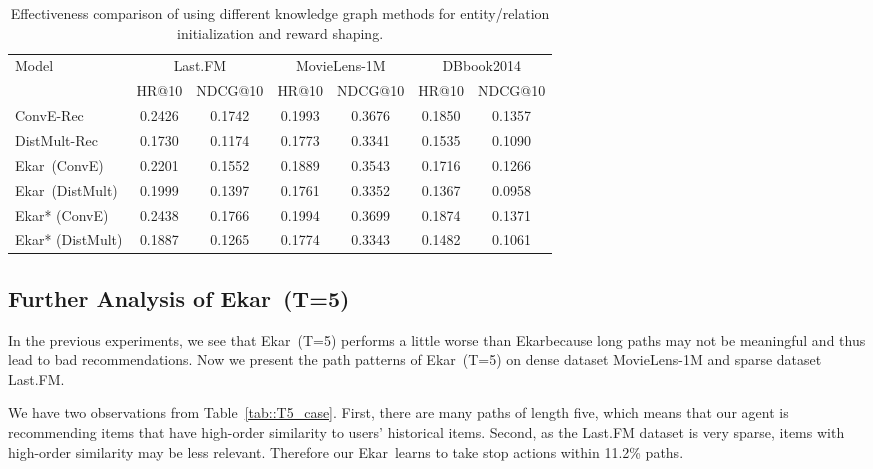 \documentclass{article}
\newcommand{\name}{Ekar}
\begin{document}
\begin{table}[ht]
\centering\caption{Effectiveness comparison of using different knowledge graph methods for entity/relation initialization and reward shaping.}\label{tab::distmult}
\begin{tabular}{lcccccc}
\toprule
\multirow{2}{*}{Model} & \multicolumn{2}{c}{Last.FM} & \multicolumn{2}{c}{MovieLens-1M} & \multicolumn{2}{c}{DBbook2014} \\
& HR@10 & NDCG@10 & HR@10 & NDCG@10 & HR@10 & NDCG@10 \\
\midrule 
ConvE-Rec & 0.2426 & 0.1742 & 0.1993 & 0.3676 & 0.1850 & 0.1357 \\\vspace{3pt}
DistMult-Rec & 0.1730 & 0.1174 & 0.1773 & 0.3341 & 0.1535 & 0.1090 \\
\name\ (ConvE) & 0.2201 & 0.1552 & 0.1889 & 0.3543 & 0.1716 & 0.1266\\\vspace{3pt}
\name\ (DistMult) & 0.1999 & 0.1397 & 0.1761 & 0.3352 & 0.1367 & 0.0958 \\
\name* (ConvE) & {0.2438} & {0.1766} & {0.1994} & {0.3699} & {0.1874} & {0.1371}\\
\name* (DistMult) & 0.1887 & 0.1265 & 0.1774 & 0.3343 & 0.1482 & 0.1061 \\
\bottomrule
\end{tabular}
\end{table}

\newpage
\subsection{Further Analysis of \name\ (T=5)}\label{app::t5}
In the previous experiments, we see that \name\ (T=5) performs a little worse than \name because long paths may not be meaningful and thus lead to bad recommendations. Now we present the path patterns of \name\ (T=5) on dense dataset MovieLens-1M and sparse dataset Last.FM.

We have two observations from Table~\ref{tab::T5_case}. First, there are many paths of length five, which means that our agent is recommending items that have high-order similarity to users' historical items. Second, as the Last.FM dataset is very sparse, items with high-order similarity may be less relevant. Therefore our \name\ learns to take stop actions within 11.2\% paths.
\end{document}
